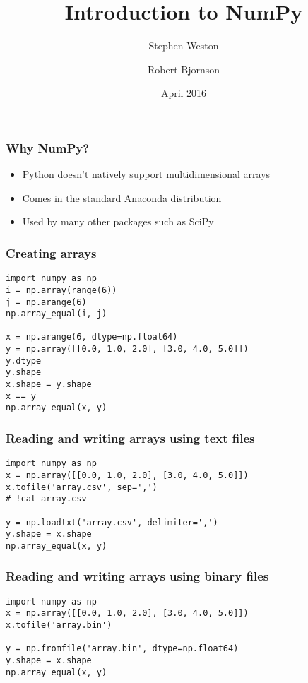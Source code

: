 \documentclass[10pt]{beamer}
\title{Introduction to NumPy}
\author{{Stephen Weston} \and {Robert Bjornson}}
\institute[Yale]{
  Yale Center for Research Computing \\
  Yale University
}
\date{April 2016}
\begin{document}
\begin{frame}[plain]
  \titlepage
\end{frame}

\begin{frame}
\frametitle{Why NumPy?}

\begin{itemize}
\item Python doesn't natively support multidimensional arrays
\item Comes in the standard Anaconda distribution
\item Used by many other packages such as SciPy
\end{itemize}
\end{frame}

\begin{frame}[fragile]
\frametitle{Creating arrays}

\begin{verbatim}
import numpy as np
i = np.array(range(6))
j = np.arange(6)
np.array_equal(i, j)

x = np.arange(6, dtype=np.float64)
y = np.array([[0.0, 1.0, 2.0], [3.0, 4.0, 5.0]])
y.dtype
y.shape
x.shape = y.shape
x == y
np.array_equal(x, y)
\end{verbatim}
\end{frame}

\begin{frame}[fragile]
\frametitle{Reading and writing arrays using text files}

\begin{verbatim}
import numpy as np
x = np.array([[0.0, 1.0, 2.0], [3.0, 4.0, 5.0]])
x.tofile('array.csv', sep=',')
# !cat array.csv

y = np.loadtxt('array.csv', delimiter=',')
y.shape = x.shape
np.array_equal(x, y)
\end{verbatim}
\end{frame}

\begin{frame}[fragile]
\frametitle{Reading and writing arrays using binary files}

\begin{verbatim}
import numpy as np
x = np.array([[0.0, 1.0, 2.0], [3.0, 4.0, 5.0]])
x.tofile('array.bin')

y = np.fromfile('array.bin', dtype=np.float64)
y.shape = x.shape
np.array_equal(x, y)
\end{verbatim}
\end{frame}
\end{document}
